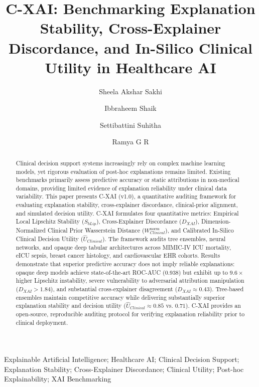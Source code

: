 \documentclass[3p,times,procedia]{elsarticle}
\theoremstyle{definition}
\begin{document}
\setlength{\bibsep}{0.8pt}
\begin{frontmatter}

\title{C-XAI: Benchmarking Explanation Stability, Cross-Explainer Discordance, and In-Silico Clinical Utility in Healthcare AI}

\author[a]{Sheela Akshar Sakhi} 
\author[a]{Ibbraheem Shaik}
\author[a]{Settibattini Suhitha}
\author[b]{Ramya G R}

\address[a]{Department of Computer Science and Engineering, Amrita School of Computing, Coimbatore. Amrita Vishwa Vidyapeetham, India.}
\address[b]{Department of Computer Science and Engineering, Amrita School of Computing, Coimbatore. Amrita Vishwa Vidyapeetham, India.}

\begin{abstract}
Clinical decision support systems increasingly rely on complex machine learning models, yet rigorous evaluation of post-hoc explanations remains limited. Existing benchmarks primarily assess predictive accuracy or static attributions in non-medical domains, providing limited evidence of explanation reliability under clinical data variability. This paper presents C-XAI (v1.0), a quantitative auditing framework for evaluating explanation stability, cross-explainer discordance, clinical-prior alignment, and simulated decision utility. C-XAI formulates four quantitative metrics: Empirical Local Lipschitz Stability ($S_{bLip}$), Cross-Explainer Discordance ($D_{XAI}$), Dimension-Normalized Clinical Prior Wasserstein Distance ($W_{Clinical}^{\mathrm{norm}}$), and Calibrated In-Silico Clinical Decision Utility ($\widehat{U}_{Clinical}$). The framework audits tree ensembles, neural networks, and opaque deep tabular architectures across MIMIC-IV ICU mortality, eICU sepsis, breast cancer histology, and cardiovascular EHR cohorts. Results demonstrate that superior predictive accuracy does not imply reliable explanations: opaque deep models achieve state-of-the-art ROC-AUC (0.938) but exhibit up to $9.6\times$ higher Lipschitz instability, severe vulnerability to adversarial attribution manipulation ($D_{XAI} > 1.84$), and substantial cross-explainer disagreement ($D_{XAI} \approx 0.43$). Tree-based ensembles maintain competitive accuracy while delivering substantially superior explanation stability and decision utility ($\widehat{U}_{Clinical} \approx 0.85$ vs. $0.71$). C-XAI provides an open-source, reproducible auditing protocol for verifying explanation reliability prior to clinical deployment.
\end{abstract}

\begin{keyword}
Explainable Artificial Intelligence; Healthcare AI; Clinical Decision Support; Explanation Stability; Cross-Explainer Discordance; Clinical Utility; Post-hoc Explainability; XAI Benchmarking
\end{keyword}

\end{frontmatter}
\vspace*{-4pt}
\end{document}
